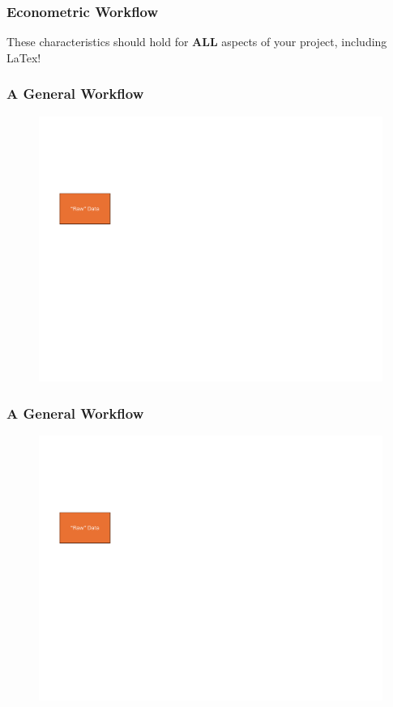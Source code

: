 \documentclass{beamer}
\begin{document}
\begin{frame}
    \frametitle{Econometric Workflow}

    \Huge These characteristics should hold for \textbf{ALL} aspects of your project, including LaTex!

\end{frame}


\begin{frame}
    \frametitle{A General Workflow}

    \begin{figure}
        \centering
        \includegraphics[width=1\textwidth,page=1]{workflow_figs.pdf}
    \end{figure}

\end{frame}

\begin{frame}
    \frametitle{A General Workflow}

    \begin{figure}
        \centering
        \includegraphics[width=1\textwidth,page=2]{workflow_figs.pdf}
    \end{figure}

\end{frame}
\end{document}
